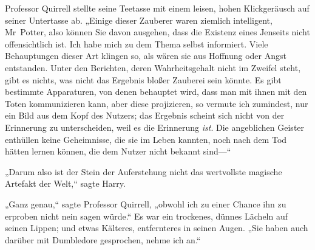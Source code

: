 Professor Quirrell stellte seine Teetasse mit einem leisen, hohen Klickgeräusch auf seiner Untertasse ab. „Einige dieser Zauberer waren ziemlich intelligent, Mr~Potter, also können Sie davon ausgehen, dass die Existenz eines Jenseits nicht offensichtlich ist. Ich habe mich zu dem Thema selbst informiert. Viele Behauptungen dieser Art klingen so, als wären sie aus Hoffnung oder Angst entstanden. Unter den Berichten, deren Wahrheitsgehalt nicht im Zweifel steht, gibt es nichts, was nicht das Ergebnis bloßer Zauberei sein könnte. Es gibt bestimmte Apparaturen, von denen behauptet wird, dass man mit ihnen mit den Toten kommunizieren kann, aber diese projizieren, so vermute ich zumindest, nur ein Bild aus dem Kopf des Nutzers; das Ergebnis scheint sich nicht von der Erinnerung zu unterscheiden, weil es die Erinnerung \emph{ist}. Die angeblichen Geister enthüllen keine Geheimnisse, die sie im Leben kannten, noch nach dem Tod hätten lernen können, die dem Nutzer nicht bekannt sind—“

„Darum also ist der Stein der Auferstehung nicht das wertvollste magische Artefakt der Welt,“ sagte Harry.

„Ganz genau,“ sagte Professor Quirrell, „obwohl ich zu einer Chance ihn zu erproben nicht nein sagen würde.“ Es war ein trockenes, dünnes Lächeln auf seinen Lippen; und etwas Kälteres, entfernteres in seinen Augen. „Sie haben auch darüber mit Dumbledore gesprochen, nehme ich an.“

